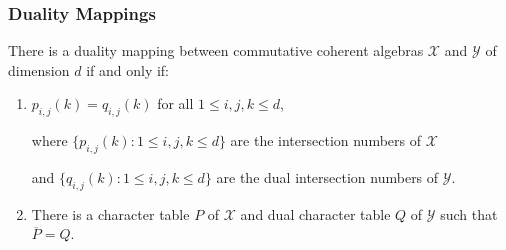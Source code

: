 \documentclass[notheorems]{beamer}
\theoremstyle{definition} %
\begin{document}
\begin{frame}

\frametitle{Duality Mappings}

	There is a duality mapping between commutative coherent algebras $\mathcal{X}$ and $\mathcal{Y}$ of dimension $d$
	if and only if:
		\begin{enumerate}
			\item $p_{i,j}(k) = q_{i,j}(k)$ for all $1 \leq i,j,k \leq d$,

				\vspace{0.5em}

				where $\{ p_{i,j}(k) : 1 \leq i,j,k \leq d \}$ are the intersection numbers of $\mathcal{X}$ 

				\vspace{0.5em}

				and $\{ q_{i,j}(k) : 1 \leq i,j,k \leq d \}$ are the dual intersection numbers of $\mathcal{Y}$.

			\item There is a character table $P$ of $\mathcal{X}$ and dual character table $Q$ of $\mathcal{Y}$ such that $\overline{P} = Q$.
		\end{enumerate}


\end{frame}
\end{document}
